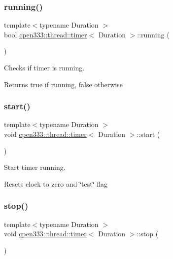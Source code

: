 \subsubsection{\texorpdfstring{running()}{running()}}
{\footnotesize\ttfamily template$<$typename Duration $>$ \\
bool \hyperlink{classcpen333_1_1thread_1_1timer}{cpen333\+::thread\+::timer}$<$ Duration $>$\+::running (\begin{DoxyParamCaption}{ }\end{DoxyParamCaption})\hspace{0.3cm}{\ttfamily [inline]}}



Checks if timer is running. 

\begin{DoxyReturn}{Returns}
true if running, false otherwise 
\end{DoxyReturn}
\mbox{\label{classcpen333_1_1thread_1_1timer_a0d1be90402f46912966ec5fc13707bce}} 
\subsubsection{\texorpdfstring{start()}{start()}}
{\footnotesize\ttfamily template$<$typename Duration $>$ \\
void \hyperlink{classcpen333_1_1thread_1_1timer}{cpen333\+::thread\+::timer}$<$ Duration $>$\+::start (\begin{DoxyParamCaption}{ }\end{DoxyParamCaption})\hspace{0.3cm}{\ttfamily [inline]}}



Start timer running. 

Resets clock to zero and \char`\"{}test\char`\"{} flag \mbox{\label{classcpen333_1_1thread_1_1timer_afa3811e04ef58d3040935c49aca19948}} 
\subsubsection{\texorpdfstring{stop()}{stop()}}
{\footnotesize\ttfamily template$<$typename Duration $>$ \\
void \hyperlink{classcpen333_1_1thread_1_1timer}{cpen333\+::thread\+::timer}$<$ Duration $>$\+::stop (\begin{DoxyParamCaption}{ }\end{DoxyParamCaption})\hspace{0.3cm}{\ttfamily [inline]}}



